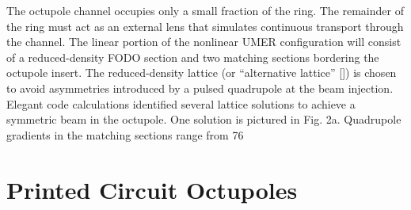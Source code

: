 The octupole channel occupies only a small fraction of the ring. The remainder of the ring must act as an external lens that simulates continuous transport through the channel. The linear portion of the nonlinear UMER configuration will consist of a reduced-density FODO section and two matching sections bordering the octupole insert. The reduced-density lattice (or “alternative lattice” []) is chosen to avoid asymmetries introduced by a pulsed quadrupole at the beam injection. Elegant code calculations identified several lattice solutions to achieve a symmetric beam in the octupole. One solution is pictured in Fig. 2a.  Quadrupole gradients in the matching sections range from 76%

\section{Printed Circuit Octupoles}


\begin{figure}[]
 \label{fig:octupcb}
\label{fig:octurotcoil}
\end{figure}


